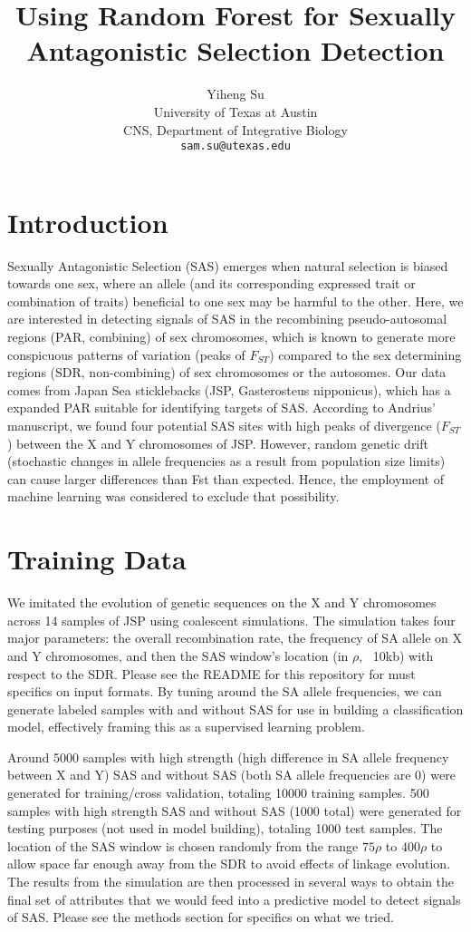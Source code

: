 \documentclass[10pt]{article}
\title{Using Random Forest for Sexually Antagonistic Selection Detection}
\author{
  Yiheng Su \\
  University of Texas at Austin \\
  CNS, Department of Integrative Biology \\
  {\tt sam.su@utexas.edu} \\}
\date{}
\begin{document}
\maketitle

\section{Introduction}

Sexually Antagonistic Selection (SAS) emerges when natural selection is biased towards one sex, where an allele (and its corresponding expressed trait or combination of traits) beneficial to one sex may be harmful to the other. Here, we are interested in detecting signals of SAS in the recombining pseudo-autosomal regions (PAR, combining) of sex chromosomes, which is known to generate more conspicuous patterns of variation (peaks of $F_{ST}$) compared to the sex determining regions (SDR, non-combining) of sex chromosomes or the autosomes. Our data comes from Japan Sea sticklebacks (JSP, Gasterosteus nipponicus), which has a expanded PAR suitable for identifying targets of SAS. According to Andrius' manuscript, we found four potential SAS sites with high peaks of divergence ($F_{ST}$) between the X and Y chromosomes of JSP. However, random genetic drift (stochastic changes in allele frequencies as a result from population size limits) can cause larger differences than Fst than expected. Hence, the employment of machine learning was considered to exclude that possibility. 

\section{Training Data}

We imitated the evolution of genetic sequences on the X and Y chromosomes across 14 samples of JSP using coalescent simulations. The simulation takes four major parameters: the overall recombination rate, the frequency of SA allele on X and Y chromosomes, and then the SAS window's location (in $\rho$, ~10kb) with respect to the SDR. Please see the README for this repository for must specifics on input formats. By tuning around the SA allele frequencies, we can generate labeled samples with and without SAS for use in building a classification model, effectively framing this as a supervised learning problem. 

Around 5000 samples with high strength (high difference in SA allele frequency between X and Y) SAS and without SAS (both SA allele frequencies are 0) were generated for training/cross validation, totaling 10000 training samples. 500 samples with high strength SAS and without SAS (1000 total) were generated for testing purposes (not used in model building), totaling 1000 test samples. The location of the SAS window is chosen randomly from the range $75 \rho$ to $400 \rho$ to allow space far enough away from the SDR to avoid effects of linkage evolution. The results from the simulation are then processed in several ways to obtain the final set of attributes that we would feed into a predictive model to detect signals of SAS. Please see the methods section for specifics on what we tried. 
\end{document}
